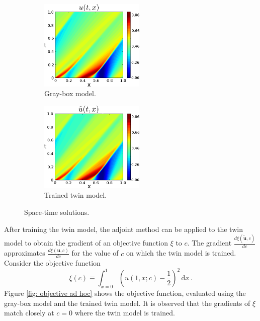 \begin{figure}[htbp]\begin{center}
    \begin{subfigure}[t]{.4\textwidth}
        \centering
        \includegraphics[width=5cm]{../leftcol.png}
        \caption{Gray-box model.}
        \label{fig: leftcol}
    \end{subfigure}
    \begin{subfigure}[t]{.4\textwidth}
        \centering
        \includegraphics[width=5cm]{../rightcol.png}
        \caption{Trained twin model.}
        \label{fig: rightcol}
    \end{subfigure}
    \caption{Space-time solutions.}
\end{center}\end{figure}

After training the twin model, the adjoint method can be applied to the twin model
to obtain the gradient of an objective function $\xi$ to 
$c$. The gradient 
$\frac{d\xi(\tilde{\boldsymbol{u}}, c)}{dc}$ approximates $\frac{d\xi(\boldsymbol{u}, c)}{dc}$
for the value of $c$ on which the twin model is trained.
Consider the objective function 
\begin{equation}
    \xi(c) \equiv \int_{x=0}^1 \left(u(1,x; c) - \frac{1}{2}\right)^2 \,\textrm{d}x\,.
    \label{eqn: objective ad hoc}
\end{equation}
Figure \ref{fig: objective ad hoc} shows the objective function, evaluated using 
the gray-box model and the trained twin model. It is observed that the gradients of $\xi$
match closely at $c=0$ where the twin model is trained.\\

